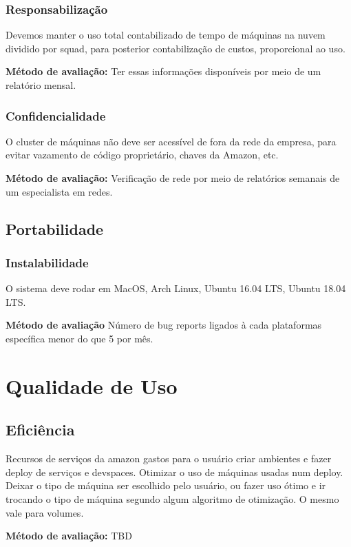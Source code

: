\documentclass[twosideprint]{politex}
\begin{document}
            \subsubsection{Responsabilização}
            Devemos manter o uso total contabilizado de tempo de máquinas na nuvem dividido por squad, para posterior contabilização de custos, proporcional ao uso.\par
            \textbf{Método de avaliação:}
            Ter essas informações disponíveis por meio de um relatório mensal.
            \subsubsection{Confidencialidade}
            O cluster de máquinas não deve ser acessível de fora da rede da empresa, para evitar vazamento de código proprietário, chaves da Amazon, etc.\par
            \textbf{Método de avaliação:}
            Verificação de rede por meio de relatórios semanais de um especialista em redes.
     \subsection{Portabilidade}
            \subsubsection{Instalabilidade}
            O sistema deve rodar em MacOS, Arch Linux, Ubuntu 16.04 LTS, Ubuntu 18.04 LTS.\par
            \textbf{Método de avaliação}
            Número de bug reports ligados à cada plataformas específica menor do que 5 por mês.
   
   \section {Qualidade de Uso}
     \subsection{Eficiência}
          Recursos de serviços da amazon gastos para o usuário criar ambientes e fazer deploy de serviços e devspaces.
               Otimizar o uso de máquinas usadas num deploy. Deixar o tipo de máquina ser escolhido pelo usuário, ou fazer uso ótimo e ir trocando o tipo de máquina segundo algum algoritmo de otimização. O mesmo vale para volumes.\par
              \textbf{Método de avaliação:}
              TBD
\end{document}
